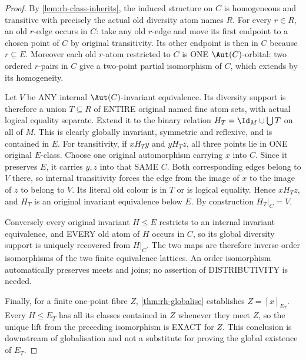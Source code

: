 \begin{proof}
By \cref{lem:rh-class-inherits},
the induced structure on $C$
is homogeneous and transitive
with precisely the actual old
diversity atom names $R$.
For every $r\in R$, an old
$r$-edge occurs in $C$:
take any old $r$-edge and move
its first endpoint to a chosen
point of $C$ by original
transitivity. Its other
endpoint is then in $C$
because $r\subseteq E$.
Moreover each old $r$-atom
restricted to $C$ is ONE
$\Aut(C)$-orbital: two
ordered $r$-pairs in $C$
give a two-point partial
isomorphism of $C$, which
extends by its homogeneity.

Let $V$ be ANY internal
$\Aut(C)$-invariant
equivalence. Its diversity
support is therefore a union
$T\subseteq R$ of ENTIRE
original named fine atom
sets, with actual logical
equality separate. Extend
it to the binary relation
$H_T=\Id_M\cup\bigcup T$
on all of $M$. This is
clearly globally invariant,
symmetric and reflexive,
and is contained in $E$.
For transitivity, if
$xH_Ty$ and $yH_Tz$,
all three points lie in ONE
original $E$-class.
Choose one original
automorphism carrying $x$
into $C$. Since it
preserves $E$, it carries
$y,z$ into that SAME $C$.
Both corresponding edges
belong to $V$ there,
so internal transitivity
forces the edge from
the image of $x$ to the
image of $z$ to belong
to $V$. Its literal old
colour is in $T$ or is
logical equality. Hence
$xH_Tz$, and $H_T$ is
an original invariant
equivalence below $E$.
By construction
$H_T|_C=V$.

Conversely every original
invariant $H\le E$
restricts to an internal
invariant equivalence,
and EVERY old atom of
$H$ occurs in $C$, so its
global diversity support
is uniquely recovered
from $H|_C$. The two
maps are therefore
inverse order
isomorphisms of the two
finite equivalence
lattices. An order
isomorphism automatically
preserves meets and joins;
no assertion of
DISTRIBUTIVITY is needed.

Finally, for a finite
one-point fibre $Z$,
\cref{thm:rh-globalise}
establishes $Z=[x]_{E_T}$.
Every $H\le E_T$ has
all its classes contained
in $Z$ whenever they meet
$Z$, so the unique lift
from the preceding
isomorphism is EXACT
for $Z$. This conclusion
is downstream of
globalisation and not
a substitute for proving
the global existence of
$E_T$.
\end{proof}

